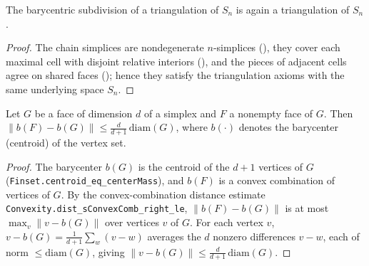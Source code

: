 \begin{lemma}
    \label{lem:barycentric-same-space}
    \leanok
    The barycentric subdivision of a triangulation of $S_n$ is again a
    triangulation of $S_n$.
\end{lemma}
\begin{proof}
    The chain simplices are nondegenerate $n$-simplices
    (), they cover each maximal cell with disjoint
    relative interiors (), and the pieces of adjacent
    cells agree on shared faces (); hence they satisfy
    the triangulation axioms with the same underlying space $S_n$.
\end{proof}

\begin{lemma}
    \label{lem:barycenter-dist-bound}
    Let $G$ be a face of dimension $d$ of a simplex and $F$ a nonempty face of
    $G$. Then $\lVert b(F) - b(G) \rVert \le \frac{d}{d+1}\,\mathrm{diam}(G)$,
    where $b(\cdot)$ denotes the barycenter (centroid) of the vertex set.
\end{lemma}
\begin{proof}
    The barycenter $b(G)$ is the centroid of the $d+1$ vertices of $G$
    (\texttt{Finset.centroid\_eq\_centerMass}), and $b(F)$ is a convex
    combination of vertices of $G$. By the convex-combination distance estimate
    \texttt{Convexity.dist\_sConvexComb\_right\_le}, $\lVert b(F) - b(G) \rVert$
    is at most $\max_v \lVert v - b(G) \rVert$ over vertices $v$ of $G$. For each
    vertex $v$, $v - b(G) = \frac{1}{d+1}\sum_{w}(v - w)$ averages the $d$ nonzero
    differences $v - w$, each of norm $\le \mathrm{diam}(G)$, giving
    $\lVert v - b(G)\rVert \le \frac{d}{d+1}\,\mathrm{diam}(G)$.
\end{proof}

